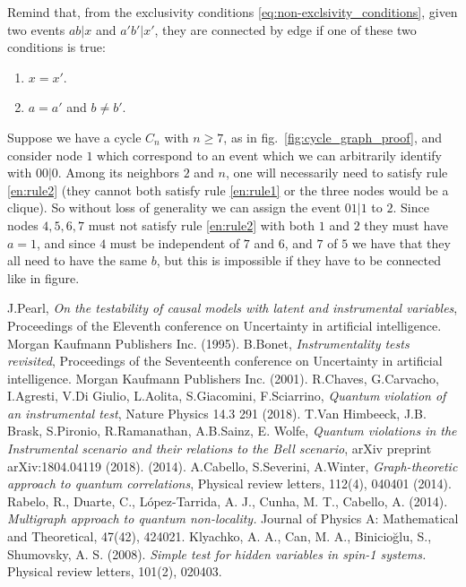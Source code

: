 \documentclass[
    nofootinbin,
    floatfix,
    amsfonts,
    twocolumn, 
    aps, 
    prl]{revtex4-1}
\begin{document}
Remind that, from the exclusivity conditions \eqref{eq:non-exclsivity_conditions},
given two events $ab|x$ and $a'b'|x'$, they are connected by edge if one of
these two conditions is true:
\begin{enumerate}
    \item $x=x'$.\label{en:rule1}
    \item $a=a'$ and $b \neq b'$.\label{en:rule2}
\end{enumerate}
Suppose we have a cycle $C_n$ with $n \ge 7$, as in fig.~\ref{fig:cycle_graph_proof},
and consider node $1$ which correspond to an event which we can arbitrarily identify
with $00|0$.
Among its neighbors $2$ and $n$, one will necessarily need to satisfy rule 
\ref{en:rule2} (they cannot both satisfy rule \ref{en:rule1} or 
the three nodes would be a clique).
So without loss of generality we can assign the event $01|1$ to $2$.
Since nodes $4,5,6,7$ must not satisfy rule \ref{en:rule2} with both $1$ and $2$ 
they must have $a = 1$, and since $4$ must be independent of $7$ and $6$, and $7$ of $5$
we have that they all need to have the same $b$, but this is impossible if they have to be
connected like in figure.

\begin{thebibliography}{}
     J.Pearl, {\em On the testability of causal models with
        latent and instrumental variables}, 
        Proceedings of the Eleventh conference on Uncertainty in artificial
        intelligence. Morgan Kaufmann Publishers Inc. (1995).
     B.Bonet, {\em Instrumentality tests revisited},
        Proceedings of the Seventeenth conference on Uncertainty in artificial
        intelligence. Morgan Kaufmann Publishers Inc. (2001).
     R.Chaves, G.Carvacho, I.Agresti, V.Di Giulio, L.Aolita,
        S.Giacomini, F.Sciarrino, 
        {\em Quantum violation of an instrumental test}, 
        Nature Physics 14.3 291 (2018).
      T.Van Himbeeck, J.B. Brask, S.Pironio, R.Ramanathan, A.B.Sainz, E. Wolfe, 
        {\em Quantum violations in the Instrumental scenario and their relations to the Bell scenario},
        arXiv preprint arXiv:1804.04119 (2018).
         (2014).
      A.Cabello, S.Severini, A.Winter,
         {\em Graph-theoretic approach to quantum correlations}, 
         Physical review letters, 112(4), 040401 (2014).
      Rabelo, R., Duarte, C., López-Tarrida, A. J., Cunha, M. T., Cabello, A. (2014). {\em Multigraph approach to quantum non-locality.} Journal of Physics A: Mathematical and Theoretical, 47(42), 424021.
      Klyachko, A. A., Can, M. A., Binicioğlu, S., Shumovsky, A. S. (2008). {\em Simple test for hidden variables in spin-1 systems.} Physical review letters, 101(2), 020403.
     
\end{thebibliography}
\end{document}
